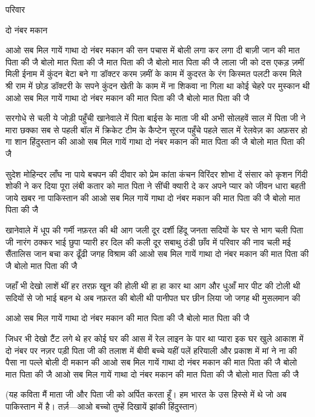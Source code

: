 परिवार

दो नंबर मकान

आओ सब मिल गायें गाथा
दो नंबर मकान की
सन पचास में बोली लगा कर
लगा दी बाज़ी जान की
मात पिता की जै बोलो
मात पिता की जै
मात पिता की जै बोलो
मात पिता की जै
लाला जी को दस एकड़
ज़मीं मिली ईनाम में
कुंदन बेटा बने गा डॉक्टर
करम ज़मीं के काम में
कुदरत के रंग किस्मत पलटी
करम मिले श्री राम में
छोड़ डॉक्टरी के सपने
कुंदन खेती के काम में
ना शिकवा ना गिला था कोई
चेहरे पर मुस्कान थी
आओ सब मिल गायें गाथा
दो नंबर मकान की
मात पिता की जै बोलो
मात पिता की जै

सरगोधे से चली ये जोड़ी
पहुँची खानेवाले में
पिता बाईस के माता जी थी
अभी सोलहवें साल में
पिता जी ने मारा छक्का
सब से पहली बॉल में
क्रिकेट टीम के कैप्टेन सूरज
पहुँचे पहले साल में
रेलवेज़ का अफ़सर हो गा
शान हिंदुस्तान की
आओ सब मिल गायें गाथा
दो नंबर मकान की
मात पिता की जै बोलो
मात पिता की जै

सुदेश मोहिन्दर लाँघ ना पाये
बचपन की दीवार को
प्रेम कांता कंचन विरिंदर
शोभा दें संसार को
कृशन गिंदी शोकी ने कर दिया
पूरा लंबी कतार को
मात पिता ने सींची क्यारी
दे कर अपने प्यार को
जीवन धारा बहती जाये
खबर ना पाकिस्तान की
आओ सब मिल गायें गाथा
दो नंबर मकान की
मात पिता की जै बोलो
मात पिता की जै

खानेवाले में धूप की गर्मी
नफ़रत की थी आग जली
दूर दर्शी हिंदू जनता
सदियों के घर से भाग चली
पिता जी नारंग ठक्कर भाई
छुपा प्यारी हर दिल की कली
दूर सबाथु ठंडी छाँव में
परिवार की नाव चली
मई सैंतालिस जान बचा कर
ढूँढी जगह विश्राम की
आओ सब मिल गायें गाथा
दो नंबर मकान की
मात पिता की जै बोलो
मात पिता की जै

जहाँ भी देखो लाशें थीं
हर तरफ़ खून की होली थी
हा हा कार था आग और धुआँ
मार पीट की टोली थी
सदियों से जो भाई बहन थे
अब नफ़रत की बोली थी
पानीपत घर छीन लिया
जो जगह थी मुसलमान की



आओ सब मिल गायें गाथा
दो नंबर मकान की
मात पिता की जै बोलो
मात पिता की जै

जिधर भी देखो टैंट लगे थे
हर कोई घर की आस में
रेल लाइन के पार था प्यारा
इक घर खुले आकाश में
दो नंबर पर नज़र पड़ी
पिता जी की तलाश में
बीवी बच्चे यहीं पलें
हरियाली और प्रकाश में
मां ने ना की पैसा ना पल्ले
बोली दी मकान की
आओ सब मिल गायें गाथा
दो नंबर मकान की
मात पिता की जै बोलो
मात पिता की जै
आओ सब मिल गायें गाथा
दो नंबर मकान की
मात पिता की जै बोलो
मात पिता की जै





(यह कविता मैं माता जी और पिता जी को
अर्पित करता हूँ। हम भारत के उस हिस्से में थे
जो अब पाकिस्तान में है।
तर्ज़—आओ बच्चो तुम्हें दिखायें झांकी हिंदुस्तान) 

